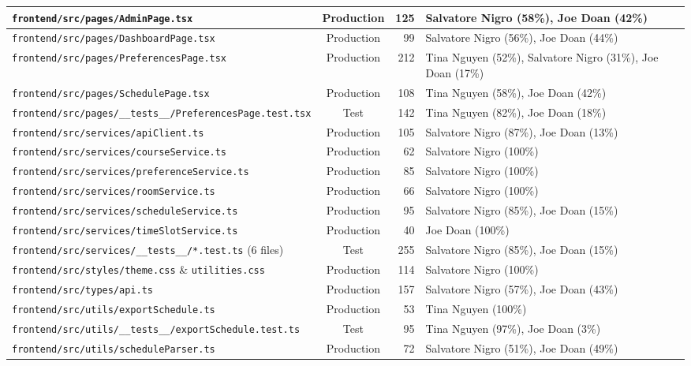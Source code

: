 \documentclass[10pt,letterpaper]{article}
\begin{document}
\begin{longtable}{|p{7.1cm}|c|r|p{6.2cm}|}
\texttt{frontend/src/pages/AdminPage.tsx} & Production & 125 & Salvatore Nigro (58\%), Joe Doan (42\%) \\ \hline
\texttt{frontend/src/pages/DashboardPage.tsx} & Production & 99 & Salvatore Nigro (56\%), Joe Doan (44\%) \\ \hline
\texttt{frontend/src/pages/PreferencesPage.tsx} & Production & 212 & Tina Nguyen (52\%), Salvatore Nigro (31\%), Joe Doan (17\%) \\ \hline
\texttt{frontend/src/pages/SchedulePage.tsx} & Production & 108 & Tina Nguyen (58\%), Joe Doan (42\%) \\ \hline
\texttt{frontend/src/pages/\_\_tests\_\_/PreferencesPage.test.tsx} & Test & 142 & Tina Nguyen (82\%), Joe Doan (18\%) \\ \hline
\texttt{frontend/src/services/apiClient.ts} & Production & 105 & Salvatore Nigro (87\%), Joe Doan (13\%) \\ \hline
\texttt{frontend/src/services/courseService.ts} & Production & 62 & Salvatore Nigro (100\%) \\ \hline
\texttt{frontend/src/services/preferenceService.ts} & Production & 85 & Salvatore Nigro (100\%) \\ \hline
\texttt{frontend/src/services/roomService.ts} & Production & 66 & Salvatore Nigro (100\%) \\ \hline
\texttt{frontend/src/services/scheduleService.ts} & Production & 95 & Salvatore Nigro (85\%), Joe Doan (15\%) \\ \hline
\texttt{frontend/src/services/timeSlotService.ts} & Production & 40 & Joe Doan (100\%) \\ \hline
\texttt{frontend/src/services/\_\_tests\_\_/*.test.ts} (6 files) & Test & 255 & Salvatore Nigro (85\%), Joe Doan (15\%) \\ \hline
\texttt{frontend/src/styles/theme.css} \& \texttt{utilities.css} & Production & 114 & Salvatore Nigro (100\%) \\ \hline
\texttt{frontend/src/types/api.ts} & Production & 157 & Salvatore Nigro (57\%), Joe Doan (43\%) \\ \hline
\texttt{frontend/src/utils/exportSchedule.ts} & Production & 53 & Tina Nguyen (100\%) \\ \hline
\texttt{frontend/src/utils/\_\_tests\_\_/exportSchedule.test.ts} & Test & 95 & Tina Nguyen (97\%), Joe Doan (3\%) \\ \hline
\texttt{frontend/src/utils/scheduleParser.ts} & Production & 72 & Salvatore Nigro (51\%), Joe Doan (49\%) \\ \hline
\end{longtable}
\normalsize
\end{document}
